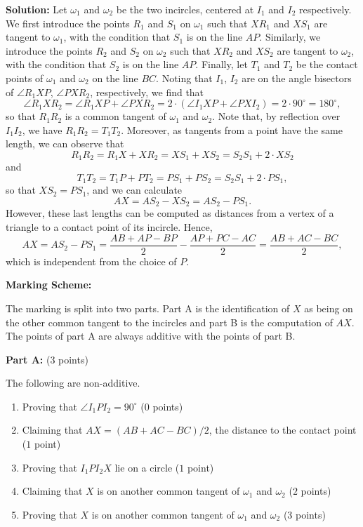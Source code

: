 

\begin{center}
\end{center}

\textbf{Solution:} Let $\omega_1$ and $\omega_2$ be the two incircles, centered at $I_1$ and $I_2$ respectively. We first introduce the points $R_1$ and $S_1$ on $\omega_1$ such that $XR_1$ and $XS_1$ are tangent to $\omega_1$, with the condition that $S_1$ is on the line $AP$. Similarly, we introduce the points $R_2$ and $S_2$ on $\omega_2$ such that $XR_2$ and $XS_2$ are tangent to $\omega_2$, with the condition that $S_2$ is on the line $AP$. Finally, let $T_1$ and $T_2$ be the contact points of $\omega_1$ and $\omega_2$ on the line $BC$. Noting that $I_1$,  $I_2$ are on the angle bisectors of $\angle R_1XP$, $\angle PXR_2$, respectively, we find that 
\[
    \angle R_1XR_2=\angle R_1XP+\angle PXR_2=2\cdot(\angle I_1XP+\angle PXI_2)=2\cdot 90^\circ=180^\circ,
\]
so that $R_1R_2$ is a common tangent of $\omega_1$ and $\omega_2$. Note that, by reflection over $I_1I_2$, we have $R_1R_2=T_1T_2$. Moreover, as tangents from a point have the same length, we can observe that
\[
    R_1R_2=R_1X+XR_2=XS_1+XS_2=S_2S_1+2\cdot XS_2
\]
and
\[
    T_1T_2=T_1P+PT_2=PS_1+PS_2=S_2S_1+2\cdot PS_1,
\]
so that $XS_2=PS_1$, and we can calculate
\[
    AX=AS_2-XS_2=AS_2-PS_1.
\]
However, these last lengths can be computed as distances from a vertex of a triangle to a contact point of its incircle. Hence,
\[
    AX=AS_2-PS_1=\frac{AB+AP-BP}{2}-\frac{AP+PC-AC}{2}=\frac{AB+AC-BC}{2},
\]
which is independent from the choice of $P$.

\newpage
\textbf{Marking Scheme:}

The marking is split into two parts. Part A is the identification of $X$ as being on the other common tangent to the incircles and part B is the computation of $AX$. The points of part A are always additive with the points of part B.

\textbf{Part A:} \dotfill ($3$ points)

The following are non-additive.
\begin{enumerate}[label=(a.\arabic*)]
    \item Proving that $\angle I_1PI_2=90^\circ$  \dotfill ($0$ points)
    \item Claiming that $AX=(AB+AC-BC)/2$, the distance to the contact point \dotfill ($1$ point)
    \item Proving that $I_1PI_2X$ lie on a circle \dotfill ($1$ point)
    \item Claiming that $X$ is on another common tangent of $\omega_1$ and $\omega_2$ \dotfill ($2$ points)
    \item Proving that $X$ is on another common tangent of $\omega_1$ and $\omega_2$ \dotfill ($3$ points)
\end{enumerate}

